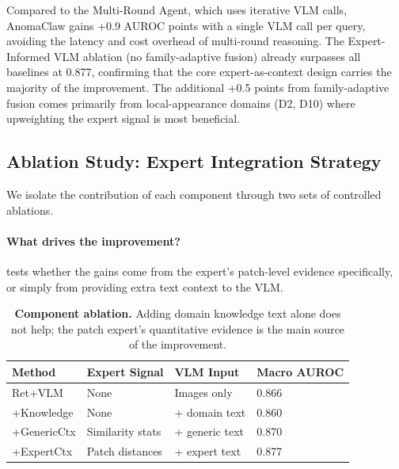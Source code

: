 Compared to the Multi-Round Agent, which uses iterative VLM calls, AnomaClaw gains +0.9 AUROC points with a single VLM call per query, avoiding the latency and cost overhead of multi-round reasoning.
The Expert-Informed VLM ablation (no family-adaptive fusion) already surpasses all baselines at 0.877, confirming that the core expert-as-context design carries the majority of the improvement.
The additional +0.5 points from family-adaptive fusion comes primarily from local-appearance domains (D2, D10) where upweighting the expert signal is most beneficial.


\subsection{Ablation Study: Expert Integration Strategy}
\label{sec:ablation}

We isolate the contribution of each component through two sets of controlled ablations.

\paragraph{What drives the improvement?}
 tests whether the gains come from the expert's patch-level evidence specifically, or simply from providing extra text context to the VLM.

\begin{table}[t]
\centering
\caption{%
    \textbf{Component ablation.}
    Adding domain knowledge text alone does not help; the patch expert's quantitative evidence is the main source of the improvement.
}
\label{tab:ablation_components}
\small
\begin{tabular}{@{}llll@{}}
\toprule
Method & Expert Signal & VLM Input & Macro AUROC \\
\midrule
Ret+VLM        & None             & Images only       & 0.866 \\
+Knowledge      & None             & + domain text     & 0.860 \\
+GenericCtx     & Similarity stats & + generic text    & 0.870 \\
+ExpertCtx      & Patch distances  & + expert text     & 0.877 \\
\bottomrule
\end{tabular}
\end{table}

